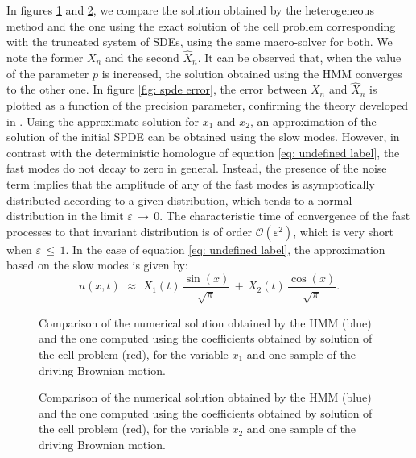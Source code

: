 In figures \ref{fig: spde different ps x1} and \ref{fig: spde different ps x2}, we compare the solution obtained by the heterogeneous method and the one using the exact solution of the cell problem corresponding with the truncated system of SDEs, using the same macro-solver for both. We note the former $X_n$ and the second $\hat X_n$. It can be observed that, when the value of the parameter $p$ is increased, the solution obtained using the HMM converges to the other one. In figure \ref{fig: spde error}, the error between $X_n$ and $\hat X_n$ is plotted as a function of the precision parameter, confirming the theory developed in \citep{abdulle2012numerical,weinan2005analysis}. Using the approximate solution for $x_1$ and $x_2$, an approximation of the solution of the initial SPDE can be obtained using the slow modes. However, in contrast with the deterministic homologue of equation \eqref{eq: undefined label}, the fast modes do not  decay to zero in general. Instead, the presence of the noise term implies that the amplitude of any of the fast modes is asymptotically distributed according to a given distribution, which tends to a normal distribution in the limit ${\varepsilon}\,\to\, 0$. The characteristic time of convergence of the fast processes to that invariant distribution is of order $\mathcal O({\varepsilon}^2)$, which is very short when ${\varepsilon}\,\leq\,1$. In the case of equation \eqref{eq: undefined label}, the approximation based on the slow modes is given by:
\begin{equation*}
    u(x,t) \,\,{\approx}\,\, X_1(t) \,\frac{\sin(x)}{\sqrt{\pi}} \,+\, X_2(t) \,\frac{\cos(x)}{\sqrt{\pi}}. 
\end{equation*}
\begin{figure}[h!]
    \begin{center}
        
    \end{center} 
    \caption{Comparison of the numerical solution obtained by the HMM (blue) and the one computed using the coefficients obtained by solution of the cell problem (red), for the variable $x_1$ and one sample of the driving Brownian motion.}
    \label{fig: spde different ps x1}
\end{figure}
\begin{figure}[h!]
    \begin{center}
        
    \end{center} 
    \caption{Comparison of the numerical solution obtained by the HMM (blue) and the one computed using the coefficients obtained by solution of the cell problem (red), for the variable $x_2$ and one sample of the driving Brownian motion.}
    \label{fig: spde different ps x2}
\end{figure}

